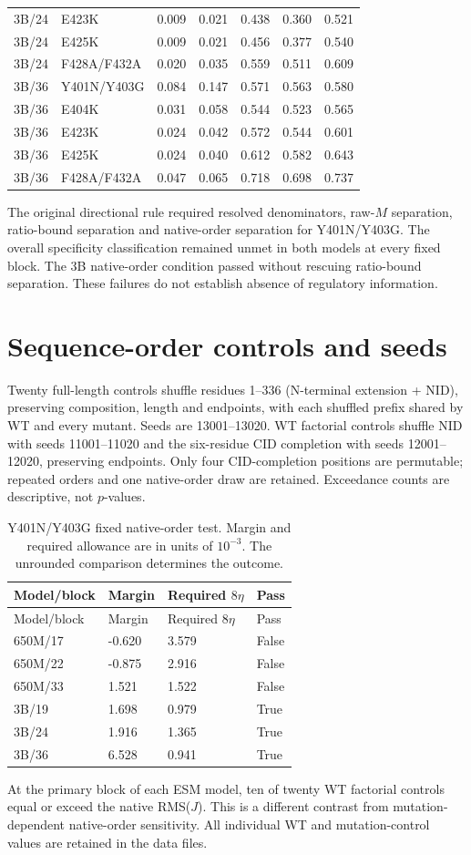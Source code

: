 \documentclass[a4paper,11pt]{scrartcl}
\begin{document}
\begin{longtable}{@{}lllllll@{}}
3B/24 & E423K & 0.009 & 0.021 & 0.438 & 0.360 & 0.521\\
3B/24 & E425K & 0.009 & 0.021 & 0.456 & 0.377 & 0.540\\
3B/24 & F428A/F432A & 0.020 & 0.035 & 0.559 & 0.511 & 0.609\\
3B/36 & Y401N/Y403G & 0.084 & 0.147 & 0.571 & 0.563 & 0.580\\
3B/36 & E404K & 0.031 & 0.058 & 0.544 & 0.523 & 0.565\\
3B/36 & E423K & 0.024 & 0.042 & 0.572 & 0.544 & 0.601\\
3B/36 & E425K & 0.024 & 0.040 & 0.612 & 0.582 & 0.643\\
3B/36 & F428A/F432A & 0.047 & 0.065 & 0.718 & 0.698 & 0.737\\
\bottomrule\end{longtable}
\endgroup
The original directional rule required resolved denominators, raw-$M$ separation, ratio-bound separation and native-order separation for Y401N/Y403G. The overall specificity classification remained unmet in both models at every fixed block. The 3B native-order condition passed without rescuing ratio-bound separation. These failures do not establish absence of regulatory information.
\section{Sequence-order controls and seeds}
Twenty full-length controls shuffle residues 1--336 (N-terminal extension + NID), preserving composition, length and endpoints, with each shuffled prefix shared by WT and every mutant. Seeds are 13001--13020. WT factorial controls shuffle NID with seeds 11001--11020 and the six-residue CID completion with seeds 12001--12020, preserving endpoints. Only four CID-completion positions are permutable; repeated orders and one native-order draw are retained. Exceedance counts are descriptive, not $p$-values.

\begingroup\small
\begin{longtable}{@{}llll@{}}
\caption{Y401N/Y403G fixed native-order test. Margin and required allowance are in units of $10^{-3}$. The unrounded comparison determines the outcome.}\\
\toprule Model/block & Margin & Required $8\eta$ & Pass\\\midrule\endfirsthead
\toprule Model/block & Margin & Required $8\eta$ & Pass\\\midrule\endhead
650M/17 & -0.620 & 3.579 & False\\
650M/22 & -0.875 & 2.916 & False\\
650M/33 & 1.521 & 1.522 & False\\
3B/19 & 1.698 & 0.979 & True\\
3B/24 & 1.916 & 1.365 & True\\
3B/36 & 6.528 & 0.941 & True\\
\bottomrule\end{longtable}
\endgroup
At the primary block of each ESM model, ten of twenty WT factorial controls equal or exceed the native RMS($J$). This is a different contrast from mutation-dependent native-order sensitivity. All individual WT and mutation-control values are retained in the data files.
\end{document}
